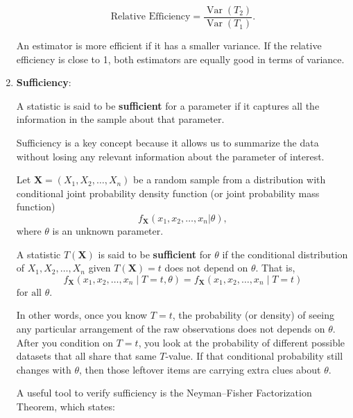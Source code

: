 \documentclass[twoside]{book}
\begin{document}
\begin{enumerate}
        \begin{textbox}
        \[
                \text{Relative Efficiency} = \frac{\operatorname{Var}(T_2)}{\operatorname{Var}(T_1)}.
                \]
        \end{textbox}
        
        An estimator is more efficient if it has a smaller variance. If the relative efficiency is close to 1, both estimators are equally good in terms of variance.

    \item \textbf{Sufficiency}: 
    
    \begin{textbox}
    A statistic is said to be \textbf{sufficient} for a parameter if it captures all the information in the sample about that parameter.
    \end{textbox} 
    
    Sufficiency is a key concept because it allows us to summarize the data without losing any relevant information about the parameter of interest.
    
    Let $\mathbf{X} = (X_1, X_2, \ldots, X_n)$ be a random sample from a distribution with conditional joint probability density function (or joint probability mass function) $$f_{\mathbf{X}}(x_1, x_2, \dots, x_n | \theta),$$ where $\theta$ is an unknown parameter. 
    
   \begin{textbox}
    A statistic $T(\mathbf{X})$ is said to be \textbf{sufficient} for $\theta$ if the conditional distribution of $X_1,X_2,\dots, X_n$ given $T(\mathbf{X}) = t$ does not depend on $\theta$. That is,
       \[
       f_{\mathbf{X}}(x_1, x_2, \dots, x_n \mid T = t, \theta) = f_{\mathbf{X}}(x_1, x_2, \dots, x_n \mid T = t)
       \]
       $ \text{for all } \theta $.
   \end{textbox}
   
   In other words, once you know \(T = t\), the probability (or density) of seeing any particular arrangement of the raw observations does not depends on \(\theta\). After you condition on \(T = t\), you look at the probability of different possible datasets that all share that same \(T\)-value. If that conditional probability still changes with \(\theta\), then those leftover items are carrying extra clues about \(\theta\). 
   
   
   A useful tool to verify sufficiency is the {Neyman–Fisher Factorization Theorem}, which states:
    

\end{enumerate}
\end{document}
